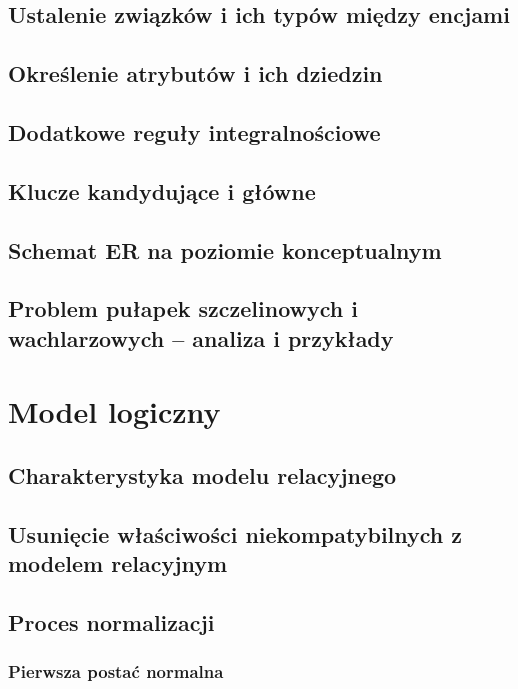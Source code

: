 \documentclass{mwrep}[15pt]
\begin{document}
\section{Ustalenie związków i ich typów między encjami}

\section{Określenie atrybutów i ich dziedzin}

\section{Dodatkowe reguły integralnościowe}

\section{Klucze kandydujące i główne}

\section{Schemat ER na poziomie konceptualnym}

\section{Problem pułapek szczelinowych i wachlarzowych – analiza i przykłady}



\chapter{Model logiczny}

\section{Charakterystyka modelu relacyjnego}

\section{Usunięcie właściwości niekompatybilnych z modelem relacyjnym}

\section{Proces normalizacji}

\subsection{Pierwsza postać normalna}
\end{document}
